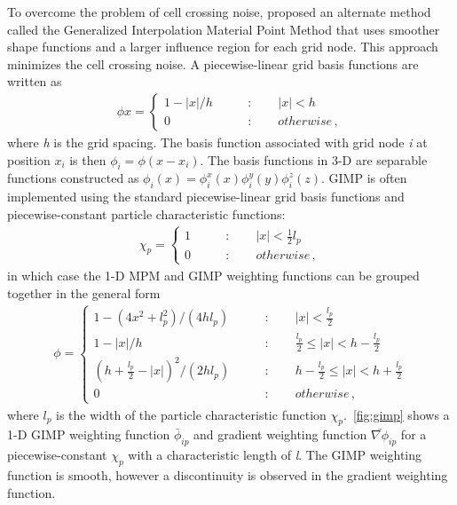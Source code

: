 To overcome the problem of cell crossing 
noise, \citet{Bardenhagen2004} proposed an alternate method called the 
Generalized Interpolation Material Point Method that uses smoother shape 
functions and a larger influence region for each grid node. This approach 
minimizes the cell crossing noise. A piecewise-linear grid basis functions are 
written as
%
\begin{align}
\phi{x} = \begin{cases}
1-\left|x\right|/h \qquad &: \qquad \left|x\right| < h \\
0 \qquad &: \qquad otherwise \,,
\end{cases}
\end{align}
where \textit{h} is the grid spacing. The basis function associated with grid 
node \textit{i} at position $x_i$ is then $\phi_i=\phi(x - x_i)$. The basis 
functions in 3-D are separable functions constructed as $\phi_i(x) = \phi_i^x(x)
\phi_i^y(y)\phi_i^z(z)$. GIMP is often implemented using the standard 
piecewise-linear grid basis functions and piecewise-constant particle 
characteristic functions:
\begin{align}
\chi_p = \begin{cases}
1 \qquad &: \qquad \left|x\right| < \frac{1}{2}l_p \\
0 \qquad &: \qquad otherwise \,,
\end{cases}
\end{align}
%
in which case the 1-D MPM and GIMP weighting functions can be grouped together 
in the general form
%
\begin{align}
\phi = \begin{cases}
1 - (4x^2+l_p^2)/(4hl_p)\qquad &: \qquad \left|x\right| < \frac{l_p}{2} \\
1 - \left|x\right|/h \qquad &: \qquad \frac{l_p}{2} \le \left|x\right| < h - 
\frac{l_p}{2} \\
\left(h +\frac{l_p}{2} - \left|x\right| \right)^2/(2hl_p) \qquad &: \qquad h - 
\frac{l_p}{2} \le \left|x\right| < h +
\frac{l_p}{2} \\
0 \qquad &: \qquad otherwise \,,
\end{cases}
\end{align}
%
where $l_p$ is the width of the particle characteristic function 
$\chi_p$.~\cref{fig:gimp} shows a 1-D GIMP weighting function $\bar{\phi}_{ip}$ 
and gradient weighting function $\bar{\nabla\phi}_{ip}$ for a 
piecewise-constant $\chi_p$ with a characteristic length of \textit{l}. The 
GIMP weighting function is smooth, however a discontinuity is observed in the 
gradient weighting function. 


